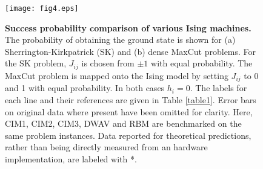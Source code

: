 \documentclass[fleqn,10pt]{wlscirep}
\def\change#1{#1}
\begin{document}
\begin{figure}[t]
\begin{center}
\texttt{[image: fig4.eps]} 
\end{center}
\caption{ {\bf Success probability comparison of various Ising machines.} The probability of obtaining the ground state is shown for (a) Sherrington-Kirkpatrick (SK) and (b) dense MaxCut  problems.  For the SK problem, $ J_{ij} $ is chosen from $ \pm 1 $ with equal probability. 
\change{The MaxCut problem is mapped onto the Ising model by setting $ J_{ij} $ to 0 and 1 with equal probability.} In both cases $ h_i =0 $. The labels for each line and their references are given in Table \ref{table1}. \change{Error bars on original data where present have been omitted for clarity.}
Here, CIM1, CIM2, CIM3, DWAV and RBM are benchmarked on the same problem instances. \change{Data reported for theoretical predictions, rather than being directly measured from an hardware implementation, are labeled with *.}
\label{fig4}} 
\end{figure}
\end{document}
